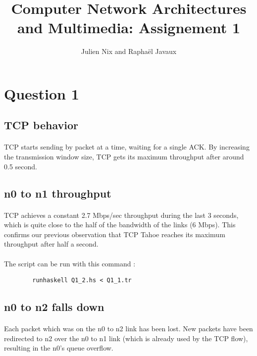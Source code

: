\documentclass[a4paper]{article}
\title{Computer Network Architectures and Multimedia: Assignement 1}
\author{Julien Nix and Raphaël Javaux}
\date{}
\begin{document}
\maketitle

 \section{Question 1}

   \subsection{TCP behavior}

    \paragraph{}TCP starts sending by packet at a time, waiting for a single ACK.
By increasing the transmission window size, TCP gets its maximum throughput
after around 0.5 second.

   \subsection{n0 to n1 throughput}

    \paragraph{}TCP achieves a constant 2.7 Mbps/sec throughput during the last
3 seconds, which is quite close to the half of the bandwidth of the links
(6 Mbps).
This confirms our previous observation that TCP Tahoe reaches its maximum
throughput after half a second.

    \paragraph{}The script can be run with this command :
    \begin{verbatim}
        runhaskell Q1_2.hs < Q1_1.tr
    \end{verbatim}

   \subsection{n0 to n2 falls down}

   \paragraph{}Each packet which was on the n0 to n2 link has been lost.
New packets have been redirected to n2 over the n0 to n1 link (which is already
used by the TCP flow), resulting in the n0's queue overflow.
\end{document}
